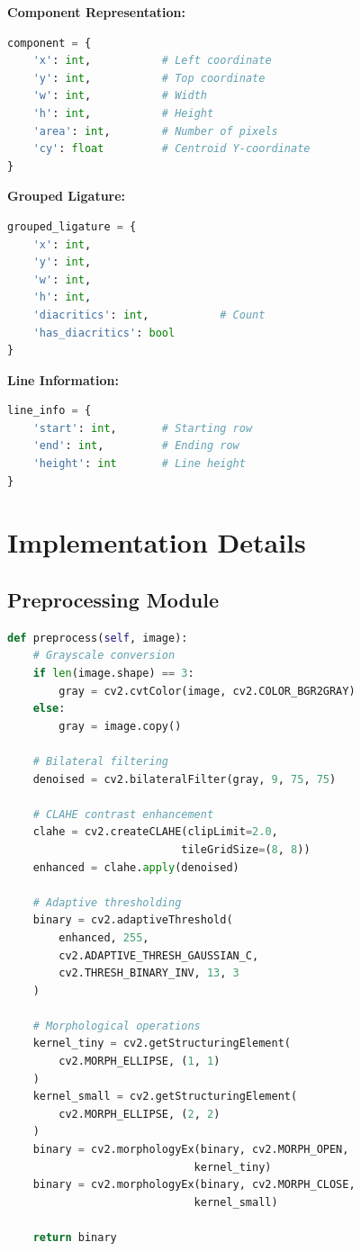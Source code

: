 \documentclass[12pt,a4paper,oneside]{report}
\begin{document}
\textbf{Component Representation:}
\begin{lstlisting}[language=Python]
component = {
    'x': int,           # Left coordinate
    'y': int,           # Top coordinate
    'w': int,           # Width
    'h': int,           # Height
    'area': int,        # Number of pixels
    'cy': float         # Centroid Y-coordinate
}
\end{lstlisting}

\textbf{Grouped Ligature:}
\begin{lstlisting}[language=Python]
grouped_ligature = {
    'x': int,
    'y': int,
    'w': int,
    'h': int,
    'diacritics': int,           # Count
    'has_diacritics': bool
}
\end{lstlisting}

\textbf{Line Information:}
\begin{lstlisting}[language=Python]
line_info = {
    'start': int,       # Starting row
    'end': int,         # Ending row
    'height': int       # Line height
}
\end{lstlisting}

\section{Implementation Details}

\subsection{Preprocessing Module}

\begin{lstlisting}[language=Python, caption=Preprocessing Implementation]
def preprocess(self, image):
    # Grayscale conversion
    if len(image.shape) == 3:
        gray = cv2.cvtColor(image, cv2.COLOR_BGR2GRAY)
    else:
        gray = image.copy()
    
    # Bilateral filtering
    denoised = cv2.bilateralFilter(gray, 9, 75, 75)
    
    # CLAHE contrast enhancement
    clahe = cv2.createCLAHE(clipLimit=2.0, 
                           tileGridSize=(8, 8))
    enhanced = clahe.apply(denoised)
    
    # Adaptive thresholding
    binary = cv2.adaptiveThreshold(
        enhanced, 255,
        cv2.ADAPTIVE_THRESH_GAUSSIAN_C,
        cv2.THRESH_BINARY_INV, 13, 3
    )
    
    # Morphological operations
    kernel_tiny = cv2.getStructuringElement(
        cv2.MORPH_ELLIPSE, (1, 1)
    )
    kernel_small = cv2.getStructuringElement(
        cv2.MORPH_ELLIPSE, (2, 2)
    )
    binary = cv2.morphologyEx(binary, cv2.MORPH_OPEN, 
                             kernel_tiny)
    binary = cv2.morphologyEx(binary, cv2.MORPH_CLOSE, 
                             kernel_small)
    
    return binary
\end{lstlisting}
\end{document}
